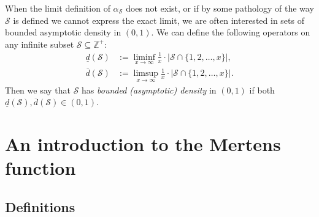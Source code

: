 \documentclass[11pt,reqno,a4letter]{article}
\numberwithin{figure}{section}
\numberwithin{table}{section}
\theoremstyle{plain}
\numberwithin{theorem}{section}
\theoremstyle{definition}
\begin{document}
When the limit definition of $\alpha_{\mathcal{S}}$ does not exist, or if by some 
pathology of the way $\mathcal{S}$ is defined we cannot express the exact limit, we are often 
interested in sets of bounded asymptotic density in $(0, 1)$. 
We can define the following operators on any infinite subset $\mathcal{S} \subseteq \mathbb{Z}^{+}$: 
\begin{align*} 
\underline{d}(\mathcal{S}) & := \liminf_{x \rightarrow \infty} \frac{1}{x} \cdot 
     \left\lvert \mathcal{S} \cap \{1,2,\ldots,x\}\right\rvert, \\ 
\overline{d}(\mathcal{S}) & := \limsup_{x \rightarrow \infty} \frac{1}{x} \cdot 
     \left\lvert \mathcal{S} \cap \{1,2,\ldots,x\}\right\rvert. 
\end{align*} 
Then we say that $\mathcal{S}$ has \emph{bounded (asymptotic) density} in $(0, 1)$ if 
both $\underline{d}(\mathcal{S}),\overline{d}(\mathcal{S}) \in (0, 1)$. 

\newpage
\section{An introduction to the Mertens function} 
\label{subSection_MertensMxClassical_Intro} 

\subsection{Definitions} 
\end{document}
